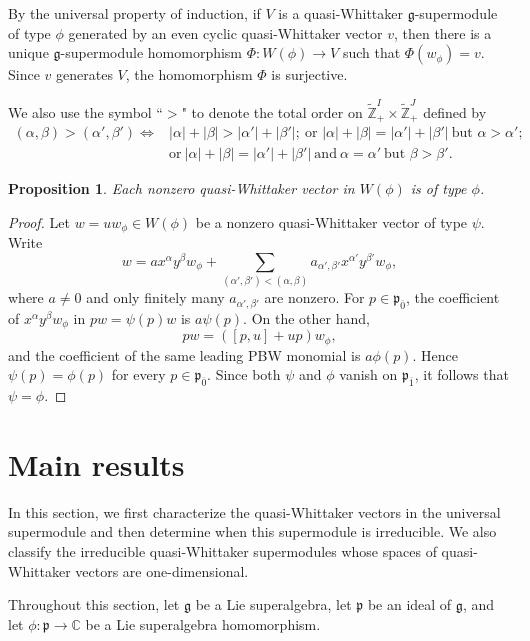 \documentclass[12pt,reqno]{article}
\newtheorem{prop}[thm]{Proposition}
\def\o{\overline}
\def\a{\alpha}
\def\b{\beta}
\def\F{\mathfrak}
\def\CC{\mathbb{C}}
\def\ZZ{\mathbb{Z}}
\def\beqn{\begin{equation*}}
\def\eeqn{\end{equation*}}
\def\({\left(}
\def\){\right)}
\begin{document}
By the universal property of induction, if $V$ is a quasi-Whittaker $\F{g}$-supermodule of type $\phi$ generated by an even cyclic quasi-Whittaker vector $v$, then there is a unique $\F{g}$-supermodule homomorphism $\Phi\colon W(\phi)\rightarrow V$ such that $\Phi(w_{\phi})=v$. Since $v$ generates $V$, the homomorphism $\Phi$ is surjective.

We also use the symbol ``$>$" to denote the total order on $\widetilde{\ZZ}_+^I\times\widetilde{\ZZ}_+^J$ defined by 
\begin{align*}
(\a,\b)>(\a',\b')\Longleftrightarrow&  |\a|+|\b|>|\a'|+|\b'|;~\text{or~}  |\a|+|\b|=|\a'|+|\b'|~\text{but~} \a>\a';\\
&\text{or}~|\a|+|\b|=|\a'|+|\b'|~\text{and}~\a=\a'~\text{but~} \b>\b'.
\end{align*}

	\begin{prop}\label{P2.4}
	Each nonzero quasi-Whittaker vector in $W(\phi)$ is of type $\phi$.
\end{prop}

\begin{proof}
Let $w=uw_{\phi}\in W(\phi)$ be a nonzero quasi-Whittaker vector of type $\psi$. Write
\beqn
w=ax^{\a}y^{\b}w_{\phi}+\sum_{(\a',\b')<(\a,\b)}a_{\a',\b'}x^{\a'}y^{\b'}w_{\phi},
\eeqn
where $a\neq0$ and only finitely many $a_{\a',\b'}$ are nonzero. For $p\in\F{p}_{\o{0}}$, the coefficient of $x^{\a}y^{\b}w_{\phi}$ in $pw=\psi(p)w$ is $a\psi(p)$. On the other hand,
\beqn
pw=\([p,u]+up\)w_{\phi},
\eeqn
and the coefficient of the same leading PBW monomial is $a\phi(p)$. Hence $\psi(p)=\phi(p)$ for every $p\in\F{p}_{\o{0}}$. Since both $\psi$ and $\phi$ vanish on $\F{p}_{\o{1}}$, it follows that $\psi=\phi$.
		\end{proof}






\section{Main results}

In this section, we first characterize the quasi-Whittaker vectors in the universal supermodule and then determine when this supermodule is irreducible. We also classify the irreducible quasi-Whittaker supermodules whose spaces of quasi-Whittaker vectors are one-dimensional.

Throughout this section, let $\F{g}$ be a Lie superalgebra, let $\F{p}$ be an ideal of $\F{g}$, and let $\phi\colon\F{p}\rightarrow\CC$ be a Lie superalgebra homomorphism.
\end{document}
